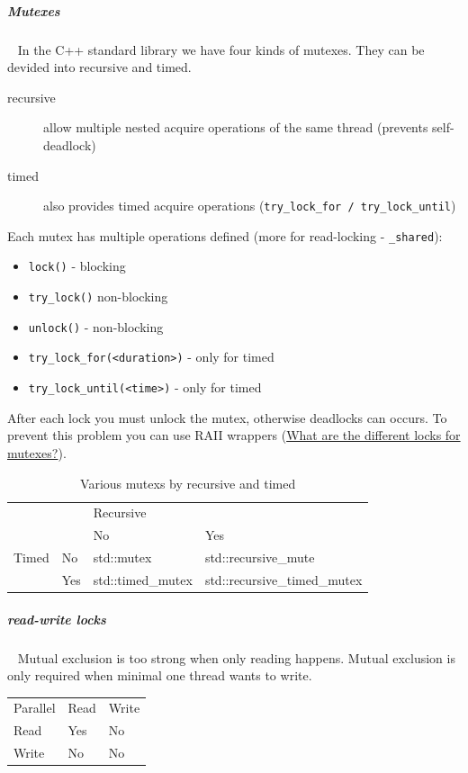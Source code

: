 \documentclass[11pt,twoside,landscape]{article}
\begin{document}
\begin{multicols}{2}
\subparagraph{Mutexes} \
\label{sec:org5fbfd46}
In the C++ standard library we have four kinds of mutexes.
They can be devided into recursive and timed.

\begin{description}
\item[{recursive}] allow multiple nested acquire operations of the same thread (prevents self-deadlock)
\item[{timed}] also provides timed acquire operations (\texttt{try\_lock\_for / try\_lock\_until})
\end{description}


Each mutex has multiple operations defined (more for read-locking - \texttt{\_shared}):
\begin{itemize}
\item \texttt{lock()} - blocking
\item \texttt{try\_lock()} non-blocking
\item \texttt{unlock()} - non-blocking
\item \texttt{try\_lock\_for(<duration>)} - only for timed
\item \texttt{try\_lock\_until(<time>)} - only for timed
\end{itemize}


After each lock you must unlock the mutex, otherwise deadlocks can occurs.
To prevent this problem you can use RAII wrappers (\href{../../../roam/20230629135006-what_are_the_different_locks_for_mutexes.org}{What are the different locks for mutexes?}).


\begin{table}[htbp]
\caption{\label{tab:org3d9b110}Various mutexs by recursive and timed}
\centering
\begin{tabular}{|l|l|l|l|}
\hline
\multicolumn{2}{|l|}{} & \multicolumn{2}{l|}{Recursive} \\
\cline{3-4}
\multicolumn{2}{|l|}{} & No & Yes \\
\hline
Timed & No & std::mutex & std::recursive\_mute \\
\cline{2-4}
 & Yes & std::timed\_mutex & std::recursive\_timed\_mutex \\
\hline
\end{tabular}
\end{table}

\subparagraph{read-write locks} \
\label{sec:org99397f6}
Mutual exclusion is too strong when only reading happens.
Mutual exclusion is only required when minimal one thread wants to write.

\begin{center}
\begin{tabular}{lll}
Parallel & Read & Write\\[0pt]
Read & Yes & No\\[0pt]
Write & No & No\\[0pt]
\end{tabular}
\end{center}



\end{multicols}
\end{document}

